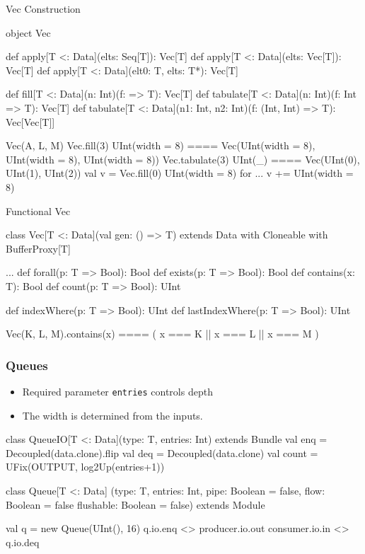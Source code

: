 \documentclass[xcolor=pdflatex,dvipsnames,table]{beamer}
\begin{document}
\begin{frame}[fragile]{Vec Construction}
\begin{scala}
object Vec {
  def apply[T <: Data](elts: Seq[T]): Vec[T]
  def apply[T <: Data](elts: Vec[T]): Vec[T]
  def apply[T <: Data](elt0: T, elts: T*): Vec[T]

  def fill[T <: Data](n: Int)(f: => T): Vec[T]
  def tabulate[T <: Data](n: Int)(f: Int => T): Vec[T]
  def tabulate[T <: Data](n1: Int, n2: Int)(f: (Int, Int) => T): Vec[Vec[T]] 
}
\end{scala}
\begin{scala}
Vec(A, L, M)
Vec.fill(3){ UInt(width = 8) } ==== 
  Vec(UInt(width = 8), UInt(width = 8), UInt(width = 8))
Vec.tabulate(3){ UInt(_) } ==== 
  Vec(UInt(0), UInt(1), UInt(2))
val v = Vec.fill(0){ UInt(width = 8) }
for ...
  v += UInt(width = 8)
\end{scala}
\end{frame}


\begin{frame}[fragile]{Functional Vec}
\begin{scala}
class Vec[T <: Data](val gen: () => T) 
    extends Data with Cloneable with BufferProxy[T] { 
  ... 
  def forall(p: T => Bool): Bool
  def exists(p: T => Bool): Bool
  def contains(x: T): Bool
  def count(p: T => Bool): UInt

  def indexWhere(p: T => Bool): UInt
  def lastIndexWhere(p: T => Bool): UInt
}
\end{scala}
\begin{scala}
Vec(K, L, M).contains(x) ==== ( x === K || x === L || x === M )
\end{scala}
\end{frame}


\begin{frame}[fragile]
\frametitle{Queues}
\begin{itemize}
\item Required parameter \verb+entries+ controls depth
\item The width is determined from the inputs.
\end{itemize}
\begin{scala}
class QueueIO[T <: Data](type: T, entries: Int) extends Bundle {
  val enq   = Decoupled(data.clone).flip
  val deq   = Decoupled(data.clone)
  val count = UFix(OUTPUT, log2Up(entries+1))
}

class Queue[T <: Data]
    (type: T, entries: Int, 
     pipe: Boolean = false,
     flow: Boolean = false
     flushable: Boolean = false)
    extends Module  
\end{scala}
\begin{scala}
val q = new Queue(UInt(), 16)
q.io.enq <> producer.io.out
consumer.io.in <> q.io.deq
\end{scala}
\end{frame}
\end{document}
